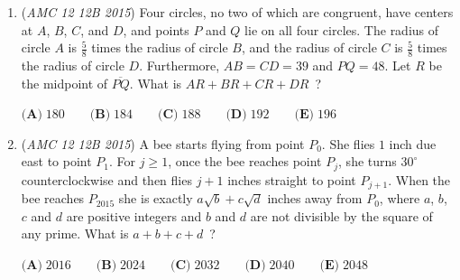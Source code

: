 \begin{enumerate}
	\item (\textit{AMC 12 12B 2015}) Four circles, no two of which are congruent, have centers at $A$, $B$, $C$, and $D$, and points $P$ and $Q$ lie on all four circles. The radius of circle $A$ is $\frac{5}{8}$ times the radius of circle $B$, and the radius of circle $C$ is $\frac{5}{8}$ times the radius of circle $D$. Furthermore, $AB = CD = 39$ and $PQ = 48$. Let $R$ be the midpoint of $\overline{PQ}$. What is $AR+BR+CR+DR$ ?


 $\textbf{(A)}\; 180 \qquad\textbf{(B)}\; 184 \qquad\textbf{(C)}\; 188 \qquad\textbf{(D)}\; 192\qquad\textbf{(E)}\; 196$


	\item (\textit{AMC 12 12B 2015}) A bee starts flying from point $P_0$. She flies $1$ inch due east to point $P_1$. For $j \ge 1$, once the bee reaches point $P_j$, she turns $30^{\circ}$ counterclockwise and then flies $j+1$ inches straight to point $P_{j+1}$. When the bee reaches $P_{2015}$ she is exactly $a \sqrt{b} + c \sqrt{d}$ inches away from $P_0$, where $a$, $b$, $c$ and $d$ are positive integers and $b$ and $d$ are not divisible by the square of any prime. What is $a+b+c+d$ ?


 $\textbf{(A)}\; 2016 \qquad\textbf{(B)}\; 2024 \qquad\textbf{(C)}\; 2032 \qquad\textbf{(D)}\; 2040 \qquad\textbf{(E)}\; 2048$


\end{enumerate}